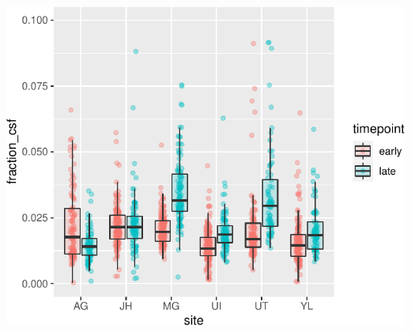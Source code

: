\documentclass[
]{article}
\begin{document}
\begin{center}\includegraphics{paper_files/figure-latex/plot_fraction_csf_both-1} \end{center}
\end{document}
